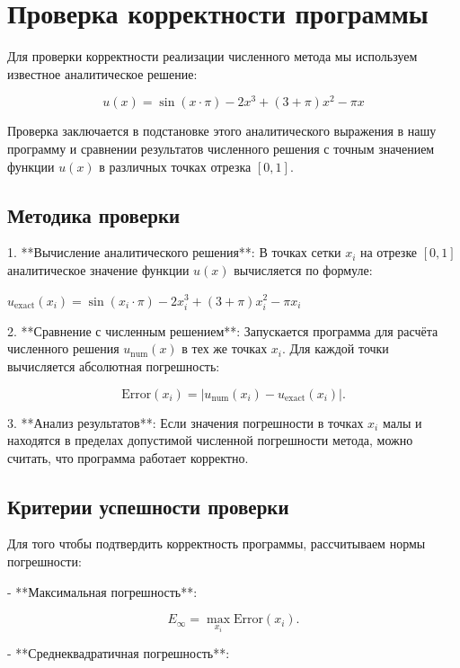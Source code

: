\documentclass{article}
\begin{document}
\section{Проверка корректности программы}

Для проверки корректности реализации численного метода мы используем известное аналитическое решение:

\begin{equation}
u(x) = \sin(x \cdot \pi) - 2x^3 + (3 + \pi)x^2 - \pi x
\end{equation}

Проверка заключается в подстановке этого аналитического выражения в нашу программу и сравнении результатов численного решения с точным значением функции \( u(x) \) в различных точках отрезка \( [0, 1] \).

\subsection{Методика проверки}

1. **Вычисление аналитического решения**: В точках сетки \( x_i \) на отрезке \( [0, 1] \) аналитическое значение функции \( u(x) \) вычисляется по формуле:


$ u_{\text{exact}}(x_i) = \sin(x_i \cdot \pi) - 2x_i^3 + (3 + \pi)x_i^2 - \pi x_i$

2. **Сравнение с численным решением**: Запускается программа для расчёта численного решения \( u_{\text{num}}(x) \) в тех же точках \( x_i \). Для каждой точки вычисляется абсолютная погрешность:

   \[
   \text{Error}(x_i) = |u_{\text{num}}(x_i) - u_{\text{exact}}(x_i)|.
   \]

3. **Анализ результатов**: Если значения погрешности в точках \( x_i \) малы и находятся в пределах допустимой численной погрешности метода, можно считать, что программа работает корректно.

\subsection{Критерии успешности проверки}

Для того чтобы подтвердить корректность программы, рассчитываем нормы погрешности:

- **Максимальная погрешность**:

  \[
  E_{\infty} = \max_{x_i} \text{Error}(x_i).
  \]

- **Среднеквадратичная погрешность**:
\end{document}
